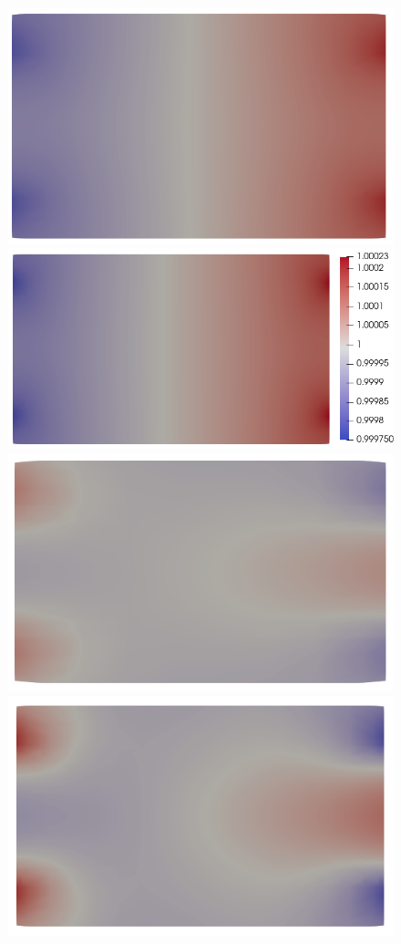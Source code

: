\documentclass{article}
\begin{document}
\begin{figure}
    \includegraphics[scale=0.27]{clip_ne_T-1_lambda-1e-1_16-3-3.png}
    \includegraphics[scale=0.27]{clip_ne_T-1_lambda-1e-1_32-3-4.png}
    \includegraphics[scale=0.27]{clip_ni_T-1_lambda-1e-1_8-2-2.png}
    \includegraphics[scale=0.27]{clip_ni_T-1_lambda-1e-1_16-3-3.png}

\end{figure}
\end{document}
